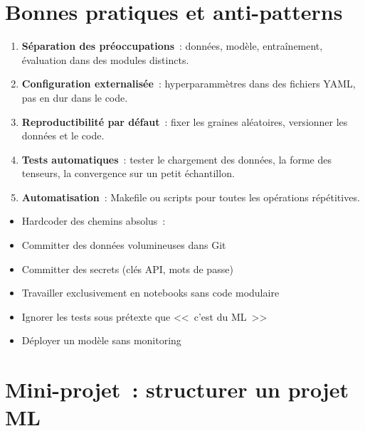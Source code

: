 \section{Bonnes pratiques et anti-patterns}

\begin{bonnepratique}[title=\textbf{Principes fondamentaux}]
\begin{enumerate}
  \item \textbf{S\'eparation des pr\'eoccupations}~: donn\'ees, mod\`ele,
    entra\^inement, \'evaluation dans des modules distincts.
  \item \textbf{Configuration externalis\'ee}~: hyperparamm\`etres dans des
    fichiers YAML, pas en dur dans le code.
  \item \textbf{Reproductibilit\'e par d\'efaut}~: fixer les graines
    al\'eatoires, versionner les donn\'ees et le code.
  \item \textbf{Tests automatiques}~: tester le chargement des donn\'ees,
    la forme des tenseurs, la convergence sur un petit \'echantillon.
  \item \textbf{Automatisation}~: Makefile ou scripts pour toutes les
    op\'erations r\'ep\'etitives.
\end{enumerate}
\end{bonnepratique}

\begin{antipattern}[title=\textbf{\`A \'eviter absolument}]
\begin{itemize}
  \item Hardcoder des chemins absolus~: 
  \item Committer des donn\'ees volumineuses dans Git
  \item Committer des secrets (cl\'es API, mots de passe)
  \item Travailler exclusivement en notebooks sans code modulaire
  \item Ignorer les tests sous pr\'etexte que <<~c'est du ML~>>
  \item D\'eployer un mod\`ele sans monitoring
\end{itemize}
\end{antipattern}

\section{Mini-projet~: structurer un projet ML}
\label{sec:mini-project-ch1}


